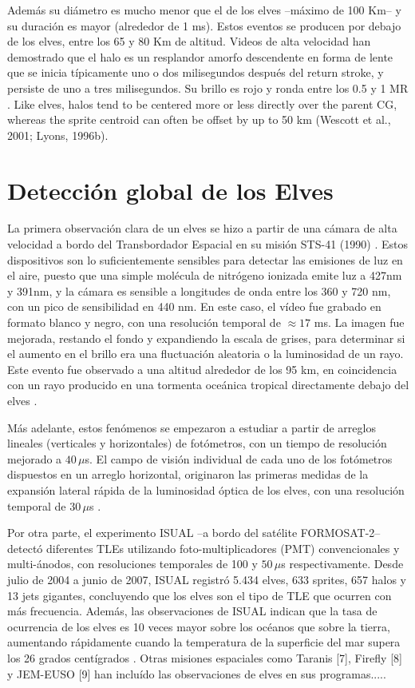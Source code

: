 \documentclass[12pt,oneside,openany,letter]{book}
\begin{document}
Además su diámetro es mucho menor que el de los elves --máximo de 100 Km-- y su duración es mayor (alrededor de 1 ms). Estos eventos se producen por debajo de los elves, entre los 65 y 80 Km de altitud. Videos de alta velocidad \cite{ArmstrongLyons2000, StanleyEtal1999, StenbaekEtal2000} han demostrado que el halo es un resplandor amorfo descendente en forma de lente que se inicia típicamente uno o dos milisegundos después del return stroke, y persiste de uno a tres milisegundos. Su brillo es rojo y ronda entre los 0.5 y 1 MR \cite{FullekrugEtal2006}. Like elves, halos tend to be centered more
or less directly over the parent CG, whereas the sprite centroid can often be
offset by up to 50 km (Wescott et al., 2001; Lyons, 1996b).


\chapter{Detección global de los Elves}\label{deteccion}
La primera observación clara de un elves se hizo a partir de una cámara de alta velocidad a bordo del Transbordador Espacial en su misión STS-41 (1990) \cite{BoeckEtal1992}. Estos dispositivos son lo suficientemente sensibles para detectar las emisiones de luz en el aire, puesto que una simple molécula de nitrógeno ionizada emite luz a 427nm y 391nm, y la cámara es sensible a longitudes de onda entre los 360 y 720 nm, con un pico de sensibilidad en 440 nm. En este caso, el vídeo fue grabado en formato blanco y negro, con una resolución temporal de $\approx 17$ ms. La imagen fue mejorada, restando el fondo y expandiendo la escala de grises, para determinar si el aumento en el brillo era una fluctuación aleatoria o la luminosidad de un rayo. Este evento fue observado a una altitud alrededor de los 95 km, en coincidencia con un rayo producido en una tormenta oceánica tropical directamente debajo del elves \cite{BoeckEtal1992}.  

Más adelante, estos fenómenos se empezaron a estudiar a partir de arreglos lineales (verticales y horizontales) de fot\'ometros, con un tiempo de resolución mejorado a $40\,\mu$s. El campo de visión individual de cada uno de los fotómetros dispuestos en un arreglo horizontal, originaron las primeras medidas de la expansión lateral rápida de la luminosidad óptica de los elves, con una resolución temporal de $30\,\mu$s \cite{InanEtal1997}. 

Por otra parte, el experimento ISUAL --a bordo del sat\'elite FORMOSAT-2-- detect\'o diferentes TLEs utilizando foto-multiplicadores (PMT) convencionales y multi-ánodos, con resoluciones temporales de 100 y $50\,\mu$s respectivamente. Desde julio de 2004 a junio de 2007, ISUAL registró 5.434 elves, 633 sprites, 657 halos y 13 jets gigantes, concluyendo que los elves son el tipo de TLE que ocurren con m\'as frecuencia. Adem\'as, las observaciones de ISUAL indican que la tasa de ocurrencia de los elves es 10 veces mayor sobre los océanos que sobre la tierra, aumentando r\'apidamente cuando la temperatura de la superficie del mar supera los 26 grados centígrados \cite{chen2008}. Otras misiones espaciales como Taranis [7], Firefly [8] y JEM-EUSO [9] han incluído las observaciones de elves en sus programas.....
\end{document}
